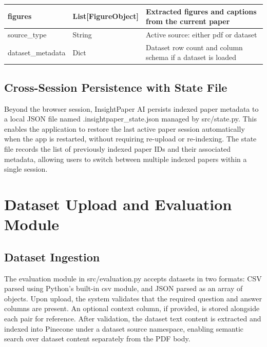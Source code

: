 \begin{table}[H]
\begin{tabular}{|p{3.5cm}|p{2.5cm}|p{7cm}|}
\hline

figures & List[FigureObject] & Extracted figures and captions from the current paper \\

\hline

source\_type & String & Active source: either pdf or dataset \\

\hline

dataset\_metadata & Dict & Dataset row count and column schema if a dataset is loaded \\

\hline

\end{tabular}

\end{table}

\subsection{Cross-Session Persistence with State File}

Beyond the browser session, InsightPaper AI persists indexed paper metadata to a local JSON file named .insightpaper\_state.json managed by src/state.py. This enables the application to restore the last active paper session automatically when the app is restarted, without requiring re-upload or re-indexing. The state file records the list of previously indexed paper IDs and their associated metadata, allowing users to switch between multiple indexed papers within a single session.

\section{Dataset Upload and Evaluation Module}

\subsection{Dataset Ingestion}

The evaluation module in src/evaluation.py accepts datasets in two formats: CSV parsed using Python's built-in csv module, and JSON parsed as an array of objects. Upon upload, the system validates that the required question and answer columns are present. An optional context column, if provided, is stored alongside each pair for reference.
\newline \newline After validation, the dataset text content is extracted and indexed into Pinecone under a dataset source namespace, enabling semantic search over dataset content separately from the PDF body.

